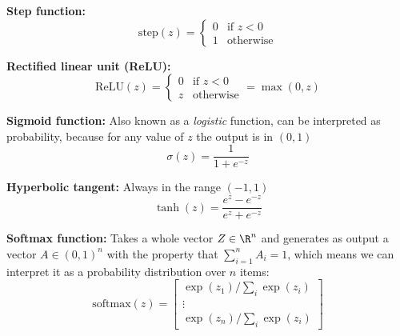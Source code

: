 \documentclass[10pt,oneside]{book}
\begin{document}
\pagestyle{empty}
\thispagestyle{empty}

\begin{description}
  \item{\bf Step function:} 
    $$\text{step}(z) =
    \begin{cases}
      0 & \text{if $z<0$}\\
      1 & \text{otherwise}
    \end{cases}$$
  \item{\bf Rectified linear unit (ReLU):} 
    $$\text{ReLU}(z) =
    \begin{cases}
      0 & \text{if $z<0$}\\
      z & \text{otherwise}
    \end{cases} = \max(0,z)$$ 
  \item{\bf Sigmoid function:} Also known as a {\em logistic} function, can
    be interpreted as probability, because for any value of $z$ the
    output is in $(0, 1)$
    $$\sigma(z) = \frac{1}{1+e^{-z}}$$
  \item{\bf Hyperbolic tangent:} Always in the range $(-1, 1)$
 $$\tanh(z) = \frac{e^z - e^{-z}}{e^z + e^{-z}}$$
\item{\bf Softmax function:}
Takes a whole vector $Z \in \R^n$ and generates as output a vector
$A \in (0, 1)^n$ with the property that $\sum_{i = 1}^n A_i = 1$,
which means we can interpret it as a probability distribution over $n$ items:
\[\text{softmax}(z) =
  \begin{bmatrix}
    \exp(z_1) / \sum_{i} \exp(z_i) \\
    \vdots \\
    \exp(z_n) / \sum_{i} \exp(z_i)
\end{bmatrix}\]

\end{description}
\end{document}
